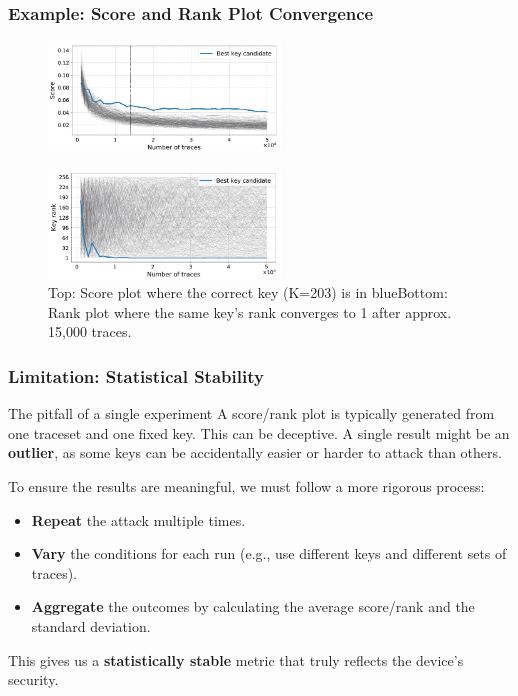 \begin{frame}
    \frametitle{Example: Score and Rank Plot Convergence}
    \begin{figure}
        \centering
        \includegraphics[width=0.55\textwidth]{metrics/Pictures/score_plot.png}
    \end{figure}
    \begin{figure}
        \centering
        \includegraphics[width=0.55\textwidth]{metrics/Pictures/rank_plot.png}
        \caption{Top: Score plot where the correct key (K=203) is in blue\newline Bottom: Rank plot where the same key's rank converges to 1 after approx. 15,000 traces.}
    \end{figure}
\end{frame}



\begin{frame}
    \frametitle{Limitation: Statistical Stability}

    \begin{block}{The pitfall of a single experiment}
        A score/rank plot is typically generated from one traceset and one fixed key. This can be deceptive. \newline
        A single result might be an \textbf{outlier}, as some keys can be accidentally easier or harder to attack than others.
    \end{block}

        To ensure the results are meaningful, we must follow a more rigorous process:
        \begin{itemize}
            \item \textbf{Repeat} the attack multiple times.
            \item \textbf{Vary} the conditions for each run (e.g., use different keys and different sets of traces).
            \item \textbf{Aggregate} the outcomes by calculating the average score/rank and the standard deviation.
        \end{itemize}
        This gives us a \textbf{statistically stable} metric that truly reflects the device's security.
\end{frame}


